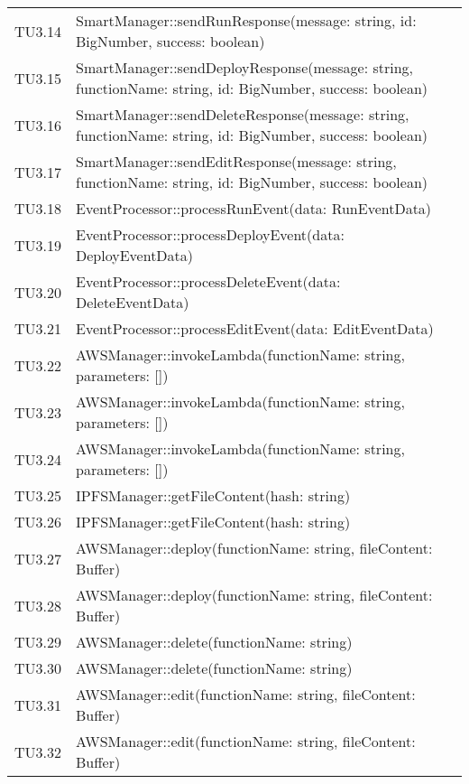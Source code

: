 \begin{longtable}{
		>{\centering}p{}
		>{}p{}}
	TU3.14 & SmartManager::sendRunResponse(message: string, id: BigNumber, success: boolean) \\
	
	TU3.15 & SmartManager::sendDeployResponse(message: string, functionName: string, id: BigNumber, success: boolean) \\
	
	TU3.16 & SmartManager::sendDeleteResponse(message: string, functionName: string, id: BigNumber, success: boolean) \\
	
	TU3.17 & SmartManager::sendEditResponse(message: string, functionName: string, id: BigNumber, success: boolean) \\
	
	TU3.18 & EventProcessor::processRunEvent(data: RunEventData) \\
	
	TU3.19 & EventProcessor::processDeployEvent(data: DeployEventData) \\
	
	TU3.20 & EventProcessor::processDeleteEvent(data: DeleteEventData) \\
	
	TU3.21 & EventProcessor::processEditEvent(data: EditEventData) \\
	
	TU3.22 & AWSManager::invokeLambda(functionName: string, parameters: []) \\
	
	TU3.23 & AWSManager::invokeLambda(functionName: string, parameters: []) \\
	
	TU3.24 & AWSManager::invokeLambda(functionName: string, parameters: []) \\
	
	TU3.25 & IPFSManager::getFileContent(hash: string) \\
	
	TU3.26 & IPFSManager::getFileContent(hash: string) \\
	
	TU3.27 & AWSManager::deploy(functionName: string, fileContent: Buffer) \\
	
	TU3.28 & AWSManager::deploy(functionName: string, fileContent: Buffer) \\
	
	TU3.29 & AWSManager::delete(functionName: string) \\
	
	TU3.30 & AWSManager::delete(functionName: string) \\
	
	TU3.31 & AWSManager::edit(functionName: string, fileContent: Buffer) \\
	
	TU3.32 & AWSManager::edit(functionName: string, fileContent: Buffer) \\

\end{longtable}
